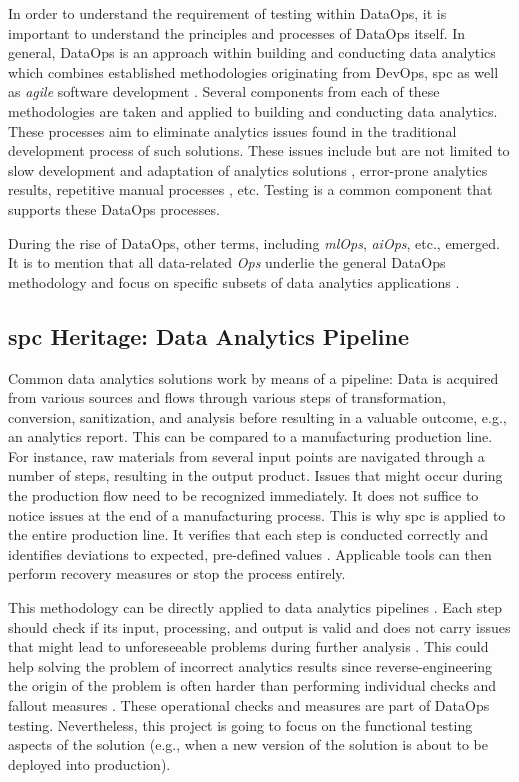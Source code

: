 In order to understand the requirement of testing within DataOps, it is important to understand the principles and processes of DataOps itself. In general, DataOps is an approach within building and conducting data analytics which combines established methodologies originating from DevOps, \ac{spc} as well as \textit{agile} software development \cite[24]{Bergh2019}. Several components from each of these methodologies are taken and applied to building and conducting data analytics. These processes aim to eliminate analytics issues found in the traditional development process of such solutions. These issues include but are not limited to slow development and adaptation of analytics solutions \cite{Lockner2019}, error-prone analytics results, repetitive manual processes \cite[11\psqq]{Bergh2019}, etc. Testing is a common component that supports these DataOps processes.

During the rise of DataOps, other terms, including \textit{\acs{ml}Ops}, \textit{\acs{ai}Ops}, etc., emerged. It is to mention that all data-related \textit{Ops} underlie the general DataOps methodology and focus on specific subsets of data analytics applications \cite{Aslett2018}.

\subsection{\acs{spc} Heritage: Data Analytics Pipeline}
Common data analytics solutions work by means of a pipeline: Data is acquired from various sources and flows through various steps of transformation, conversion, sanitization, and analysis before resulting in a valuable outcome, e.g., an analytics report. This can be compared to a manufacturing production line. For instance, raw materials from several input points are navigated through a number of steps, resulting in the output product. Issues that might occur during the production flow need to be recognized immediately. It does not suffice to notice issues at the end of a manufacturing process. This is why \acf{spc} is applied to the entire production line. It verifies that each step is conducted correctly and identifies deviations to expected, pre-defined values \cite[1]{Knoth2002}. Applicable tools can then perform recovery measures or stop the process entirely.

This methodology can be directly applied to data analytics pipelines \cite[27]{Bergh2019}. Each step should check if its input, processing, and output is valid and does not carry issues that might lead to unforeseeable problems during further analysis \cite{DataKitchen2020a}. This could help solving the problem of incorrect analytics results since reverse-engineering the origin of the problem is often harder than performing individual checks and fallout measures \cite{Redman2020}. These operational checks and measures are part of DataOps testing. Nevertheless, this project is going to focus on the functional testing aspects of the solution (e.g., when a new version of the solution is about to be deployed into production).

